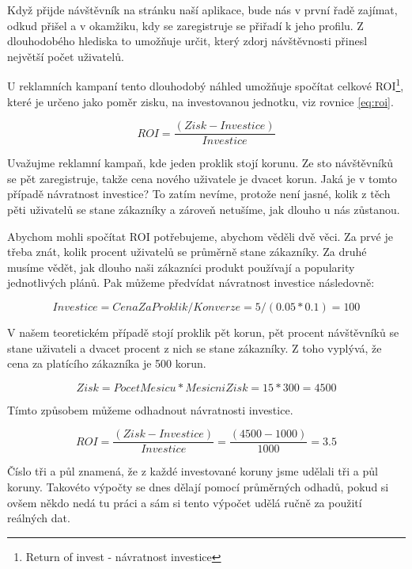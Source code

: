 \documentclass[bc,female,java,dept456]{diploma}						%
\begin{document}
Když přijde návštěvník na stránku naší aplikace, bude nás v první řadě zajímat, odkud přišel a v okamžiku, kdy se zaregistruje se přiřadí k jeho profilu. Z dlouhodobého hlediska to umožňuje určit, který zdorj návštěvnosti přinesl největší počet uživatelů. 

U reklamních kampaní tento dlouhodobý náhled umožňuje spočítat celkové ROI\footnote{Return of invest - návratnost investice}, které je určeno jako poměr zisku, na investovanou jednotku, viz rovnice \ref{eq:roi}.

\begin{equation}\label{eq:roi}
ROI = \frac{(Zisk - Investice)}{Investice}
\end{equation}

Uvažujme reklamní kampaň, kde jeden proklik stojí korunu. Ze sto návštěvníků se pět zaregistruje, takže cena nového uživatele je dvacet korun. Jaká je v tomto případě návratnost investice? To zatím nevíme, protože není jasné, kolik z těch pěti uživatelů se stane zákazníky a zároveň netušíme, jak dlouho u nás zůstanou.

Abychom mohli spočítat ROI potřebujeme, abychom věděli dvě věci. Za prvé je třeba znát, kolik procent uživatelů se průměrně stane zákazníky. Za druhé musíme vědět, jak dlouho naši zákazníci produkt používají a popularity jednotlivých plánů. Pak můžeme předvídat návratnost investice následovně:


\begin{equation}\label{eq:roi2}
Investice = CenaZaProklik / Konverze = 5 / (0.05 * 0.1) = 100
\end{equation}

V našem teoretickém případě stojí proklik pět korun, pět procent návštěvníků se stane uživateli a dvacet procent z nich se stane zákazníky. Z toho vyplývá, že cena za platícího zákazníka je 500 korun.


\begin{equation}\label{eq:roi3}
Zisk = PocetMesicu * MesicniZisk = 15 * 300 = 4500
\end{equation}

Tímto způsobem můžeme odhadnout návratnosti investice.

\begin{equation}\label{eq:roi4}
ROI = \frac{(Zisk - Investice)}{Investice} = \frac{(4500 - 1000)}{1000} = 3.5
\end{equation}

Číslo tři a půl znamená, že z každé investované koruny jsme udělali tři a půl koruny. Takovéto výpočty se dnes dělají pomocí průměrných odhadů, pokud si ovšem někdo nedá tu práci a sám si tento výpočet udělá ručně za použití reálných dat.
\end{document}
